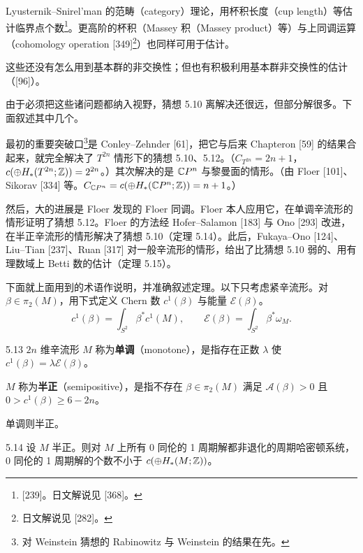 Lyusternik–Snirel'man 的范畴（category）理论，用杯积长度（cup length）等估计临界点个数\footnote{[239]。日文解说见 [368]。}。更高阶的杯积（Massey 积（Massey product）等）与上同调运算（cohomology operation [349]\footnote{日文解说见 [282]。}）也同样可用于估计。

这些还没有怎么用到基本群的非交换性；但也有积极利用基本群非交换性的估计（[96]）。

由于必须把这些诸问题都纳入视野，猜想 5.10 离解决还很远，但部分解很多。下面叙述其中几个。

最初的重要突破口\footnote{对 Weinstein 猜想的 Rabinowitz 与 Weinstein 的结果在先。}是 Conley–Zehnder [61]，把它与后来 Chapteron [59] 的结果合起来，就完全解决了 $T^{2n}$ 情形下的猜想 5.10、5.12。（$C_{T^{2n}}=2n+1$，$c(\oplus H_*(T^{2n};\mathbb{Z}))=2^{2n}$。）其次解决的是 $\mathbb{C}P^n$ 与黎曼面的情形。（由 Floer [101]、Sikorav [334] 等。$C_{\mathbb{C}P^n}=c(\oplus H_*(\mathbb{C}P^n;\mathbb{Z}))=n+1$。）

然后，大的进展是 Floer 发现的 Floer 同调。Floer 本人应用它，在单调辛流形的情形证明了猜想 5.12。Floer 的方法经 Hofer–Salamon [183] 与 Ono [293] 改进，在半正辛流形的情形解决了猜想 5.10（定理 5.14）。此后，Fukaya–Ono [124]、Liu–Tian [237]、Ruan [317] 对一般辛流形的情形，给出了比猜想 5.10 弱的、用有理数域上 Betti 数的估计（定理 5.15）。

下面就上面用到的术语作说明，并准确叙述定理。以下只考虑紧辛流形。对 $\beta\in\pi_2(M)$，用下式定义 Chern 数 $c^1(\beta)$ 与能量 $\mathcal{E}(\beta)$。
\[
  c^1(\beta)=\int_{S^2}\beta^*c^1(M),\qquad
  \mathcal{E}(\beta)=\int_{S^2}\beta^*\omega_M.
\]

\begin{definition}{5.13}
  $2n$ 维辛流形 $M$ 称为\textbf{单调}（monotone），是指存在正数 $\lambda$ 使 $c^1(\beta)=\lambda\mathcal{E}(\beta)$。

  $M$ 称为\textbf{半正}（semipositive），是指不存在 $\beta\in\pi_2(M)$ 满足 $\mathcal{A}(\beta)>0$ 且 $0>c^1(\beta)\ge6-2n$。
\end{definition}


单调则半正。

\begin{theorem}{5.14}
  设 $M$ 半正。则对 $M$ 上所有 0 同伦的 1 周期解都非退化的周期哈密顿系统，0 同伦的 1 周期解的个数不小于 $c(\oplus H_*(M;\mathbb{Z}))$。
\end{theorem}


